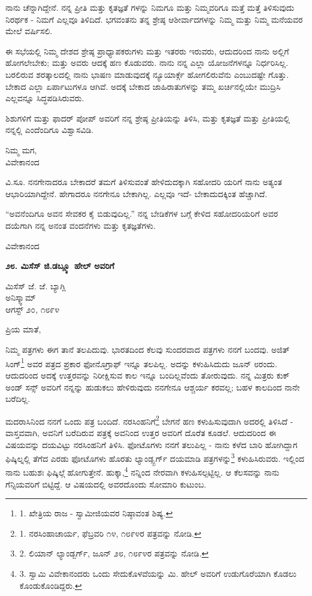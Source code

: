 ನಾನು ಚೆನ್ನಾಗಿದ್ದೇನೆ. ನನ್ನ ಪ್ರೀತಿ ಮತ್ತು ಕೃತಜ್ಞತೆ ಗಳನ್ನು ನಿಮಗೂ ಮತ್ತು ನಿಮ್ಮವರಿಗೂ ಮತ್ತೆ ಮತ್ತೆ ತಿಳಿಸುವುದು ನಿರರ್ಥಕ - ನಿಮಗೆ ಎಲ್ಲವೂ ತಿಳಿದಿದೆ. ಭಗವಂತನು ತನ್ನ ಶ್ರೇಷ್ಠ ಆಶೀರ್ವಾದಗಳನ್ನು ನಿಮ್ಮ ಮತ್ತು ನಿಮ್ಮ ಮನೆಯವರ ಮೇಲೆ ವರ್ಷಿಸಲಿ.

ಈ ಸಭೆಯಲ್ಲಿ ನಿಮ್ಮ ದೇಶದ ಶ್ರೇಷ್ಠ ಪ್ರಾಧ್ಯಾಪಕರುಗಳು ಮತ್ತು ಇತರರು ಇರುವರು, ಆದುದರಿಂದ ನಾನು ಅಲ್ಲಿಗೆ ಹೋಗಲೇಬೇಕು; ಮತ್ತು ಅವರು ಆದಕ್ಕೆ ಹಣ ಕೊಡುವರು. ನಾನು ನನ್ನ ಎಲ್ಲಾ ಯೋಜನೆಗಳನ್ನೂ ನಿರ್ಧರಿಸಿಲ್ಲ. ಬರಲಿರುವ ಶರತ್ಕಾಲದಲ್ಲಿ ನಾನು ಭಾಷಣ ಮಾಡುವುದಕ್ಕೆ ನ್ಯೂಯಾರ್ಕ್ಗೆ ಹೋಗಲಿರುವೆನು ಎಂಬುದಷ್ಟೇ ಗೊತ್ತು. ಬೇಕಾದ ಎಲ್ಲಾ ಏರ್ಪಾಟುಗಳೂ ಆಗಿವೆ. ಅದಕ್ಕೆ ಬೇಕಾದ ಜಾಹಿರಾತುಗಳನ್ನು ತಮ್ಮ ಖರ್ಚಿನಲ್ಲಿಯೇ ಮುದ್ರಿಸಿ ಎಲ್ಲವನ್ನೂ ಸಿದ್ಧಪಡಿಸಿರುವರು.

ಶಿಶುಗಳಿಗೆ ಮತ್ತು ಫಾದರ್ ಪೋಪ್ ಅವರಿಗೆ ನನ್ನ ಶ್ರೇಷ್ಠ ಪ್ರೀತಿಯನ್ನು ತಿಳಿಸಿ, ಮತ್ತು ಕೃತಜ್ಞತೆ ಮತ್ತು ಪ್ರೀತಿಯಲ್ಲಿ ನನ್ನಲ್ಲಿ ಎಂದೆಂದಿಗೂ ವಿಶ್ವಾಸವಿಡಿ.

\begin{flushright}
ನಿಮ್ಮ ಮಗ,\\ವಿವೇಕಾನಂದ
\end{flushright}

ವಿ.ಸೂ. ನನಗೇನಾದರೂ ಬೇಕಾದರೆ ತಮಗೆ ತಿಳಿಸುವಂತೆ ಹೇಳಿದುದಕ್ಕಾಗಿ ಸಹೋದರಿ ಯರಿಗೆ ನಾನು ಅತ್ಯಂತ ಆಭಾರಿಯಾಗಿದ್ದೇನೆ. ಹೇಗಾದರೂ ನನಗೇನೂ ಬೇಕಾಗಿಲ್ಲ. ಎಲ್ಲವೂ ಇದೆ- ಬೇಕಾದುದಕ್ಕಿಂತ ಹೆಚ್ಚಾಗಿದೆ.

“ಅವನೆಂದಿಗೂ ಅವನ ಸೇವಕರ ಕೈ ಬಿಡುವುದಿಲ್ಲ.” ನನ್ನ ಬೇಡಿಕೆಗಳ ಬಗ್ಗೆ ಕೇಳಿದ ಸಹೋದರಿಯರಿಗೆ ಅವರ ದಯೆಗಾಗಿ ನನ್ನ ಅನಂತ ವಂದನೆಗಳು ಮತ್ತು ಕೃತಜ್ಞತೆಗಳು.

\begin{flushright}
ವಿವೇಕಾನಂದ
\end{flushright}

\begin{center}
\textbf{೨೮. ಮಿಸೆಸ್ ಜಿ.ಡಬ್ಲ್ಯೂ ಹೇಲ್ ಅವರಿಗೆ}
\end{center}

\begin{flushright}
 ಮಿಸೆಸ್ ಜೆ. ಜೆ. ಬ್ಯಾಗ್ಲಿ\\ಅನಿಸ್ಕ್ವಾಮ್​\\ಆಗಸ್ಟ್ ೨೦, ೧೮೯೪
\end{flushright}

ಪ್ರಿಯ ಮಾತೆ,

ನಿಮ್ಮ ಪತ್ರಗಳು ಈಗ ತಾನೆ ತಲಪಿದುವು. ಭಾರತದಿಂದ ಕೆಲವು ಸುಂದರವಾದ ಪತ್ರಗಳು ನನಗೆ ಬಂದವು. ಅಜಿತ್ ಸಿಂಗ್\footnote{1. ಖೇತ್ರಿಯ ರಾಜ - ಸ್ವಾಮೀಜಿಯವರ ನಿಷ್ಠಾವಂತ ಶಿಷ್ಯ.} ಅವರ ಪತ್ರದ ಪ್ರಕಾರ ಫೋನೊಗ್ರಾಫ್ ಇನ್ನೂ ತಲಪಿಲ್ಲ. ಅದನ್ನು ಕಳುಹಿಸಿದುದು ಜೂನ್ ೮ರಂದು. ಆದುದರಿಂದ ಅದಕ್ಕೆ ಉತ್ತರವನ್ನು ನಿರೀಕ್ಷಿಸುವ ಕಾಲ ಇನ್ನೂ ಬಂದಿಲ್ಲವೆಂದು ತೋರುವುದು. ನನ್ನ ಮಿತ್ರರು ಕುಕ್ ಅಂಡ್ ಸನ್ಸ್ ಅವರಿಗೆ ನನ್ನನ್ನು ಹುಡುಕಲು ಹೇಳಿರುವುದು ನನಗೇನೂ ಆಶ್ಚರ್ಯ ಕರವಲ್ಲ; ಬಹಳ ಕಾಲದಿಂದ ನಾನೇ ಬರೆದಿಲ್ಲ.

ಮದರಾಸಿನಿಂದ ನನಗೆ ಒಂದು ಪತ್ರ ಬಂದಿದೆ. ನರಸಿಂಹನಿಗೆ\footnote{1. ನರಸಿಂಹಾಚಾರ್ಯ, ಫೆಬ್ರವರಿ ೧೪, ೧೮೯೪ರ ಪತ್ರವನ್ನು ನೋಡಿ.} ಬೇಗನೆ ಹಣ ಕಳುಹಿಸುವುದಾಗಿ ಅದರಲ್ಲಿ ತಿಳಿಸಿದೆ - ವಾಸ್ತವವಾಗಿ, ಅವನಿಗೆ ಬರೆದಿರುವ ಪತ್ರಕ್ಕೆ ಅವನಿಂದ ಉತ್ತರ ಅವರಿಗೆ ದೊರೆತ ಕೂಡಲೆ. ಆದುದರಿಂದ ಈ ವಿಷಯವನ್ನು ದಯವಿಟ್ಟು ನರಸಿಂಹನಿಗೆ ತಿಳಿಸಿ. ಫೋಟೊಗಳು ನನಗೆ ತಲುಪಿಲ್ಲ - ನಾನು ಕಳೆದ ಬಾರಿ ಹೋಗಿದ್ದಾಗ ಫಿಷ್ಕಿಲ್ನಲ್ಲಿ ತೆಗೆದ ಎರಡು ಫೋಟೊಗಳು ಹೊರತು ಲ್ಯಾಂಡ್ಸ್ಬರ್ಗ್ ದಯಮಾಡಿ ಪತ್ರಗಳನ್ನು\footnote{2. ಲಿಯಾನ್ ಲ್ಯಾಂಡ್ಬರ್ಗ್, ಜೂನ್ ೨೮, ೧೮೯೪ರ ಪತ್ರವನ್ನು ನೋಡಿ.} ಕಳುಹಿಸಿರುವರು. ಇಲ್ಲಿಂದ ನಾನು ಬಹುಶಃ ಫಿಷ್ಕಿಲ್ಗೆ ಹೋಗುತ್ತೇನೆ. ಹುಕ್ಕಾ,\footnote{3. ಸ್ವಾಮಿ ವಿವೇಕಾನಂದರು ಒಂದು ಸೇದುಕೊಳವೆಯನ್ನು ಮಿ. ಹೇಲ್ ಅವರಿಗೆ ಉಡುಗೊರೆಯಾಗಿ ಕೊಡಲು ಕೊಂಡುಕೊಂಡಿದ್ದರು.} ನನ್ನಿಂದ ನೇರವಾಗಿ ಕಳುಹಿಸಲ್ಪಟ್ಟಿಲ್ಲ. ಆ ಕೆಲಸವನ್ನು ನಾನು ಗೆನ್ಸಿಯವರಿಗೆ ಬಿಟ್ಟಿದ್ದೆ. ಆ ವಿಷಯದಲ್ಲಿ ಅವರದೊಂದು ಸೋಮಾರಿ ಕುಟುಂಬ.

